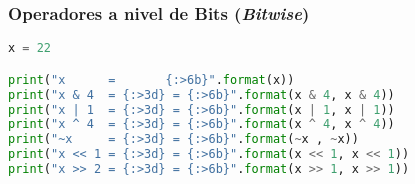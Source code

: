 \begin{frame}[fragile]
  \frametitle{Operadores a nivel de Bits (\emph{Bitwise})}

  \begin{lstlisting}[language=Python]
x = 22

print("x      =       {:>6b}".format(x))
print("x & 4  = {:>3d} = {:>6b}".format(x & 4, x & 4))
print("x | 1  = {:>3d} = {:>6b}".format(x | 1, x | 1))
print("x ^ 4  = {:>3d} = {:>6b}".format(x ^ 4, x ^ 4))
print("~x     = {:>3d} = {:>6b}".format(~x , ~x))
print("x << 1 = {:>3d} = {:>6b}".format(x << 1, x << 1))
print("x >> 2 = {:>3d} = {:>6b}".format(x >> 1, x >> 1))
  \end{lstlisting}
\end{frame}
